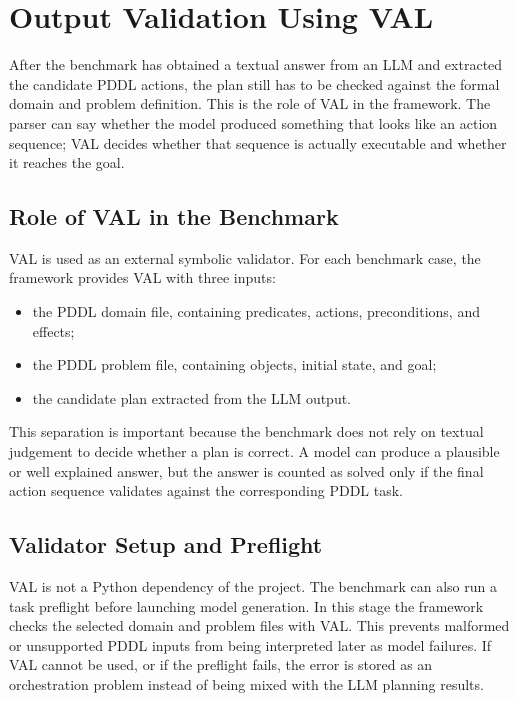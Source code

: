 \section{Output Validation Using VAL}

After the benchmark has obtained a textual answer from an LLM and extracted the
candidate PDDL actions, the plan still has to be checked against the formal
domain and problem definition. This is the role of VAL in the framework. The
parser can say whether the model produced something that looks like an action
sequence; VAL decides whether that sequence is actually executable and whether
it reaches the goal.

\subsection{Role of VAL in the Benchmark}

VAL is used as an external symbolic validator. For each benchmark case, the
framework provides VAL with three inputs:

\begin{itemize}
    \item the PDDL domain file, containing predicates, actions, preconditions,
    and effects;
    \item the PDDL problem file, containing objects, initial state, and goal;
    \item the candidate plan extracted from the LLM output.
\end{itemize}

This separation is important because the benchmark does not rely on textual
judgement to decide whether a plan is correct. A model can produce a plausible
or well explained answer, but the answer is counted as solved only if the final
action sequence validates against the corresponding PDDL task.

\subsection{Validator Setup and Preflight}

VAL is not a Python dependency of the project. The benchmark can also run a task preflight before launching model generation.
In this stage the framework checks the selected domain and problem files with
VAL. This prevents malformed or unsupported PDDL inputs from being interpreted
later as model failures. If VAL cannot be used, or if the preflight fails,
the error is stored as an orchestration problem instead of being mixed with the
LLM planning results.

